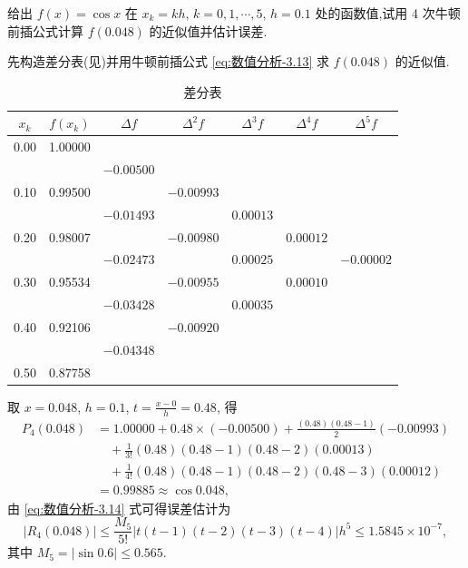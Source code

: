 \documentclass[../../main.tex]{subfiles}%
\begin{document}
\begin{example}
给出 $f(x) = \cos x$ 在 $x_k = kh$, $k = 0, 1, \cdots, 5$, $h = 0.1$ 处的函数值,试用 4 次牛顿前插公式计算 $f(0.048)$ 的近似值并估计误差.
\end{example}
\begin{solution}
先构造差分表(见)并用牛顿前插公式 \eqref{eq:数值分析-3.13} 求 $f(0.048)$ 的近似值.
\begin{table}[H]
\centering
\caption{差分表}
\label{tab:difference-table12312344343452345634456}
\begin{tabular}{c c c c c c c}
\toprule
$x_k$ & $f(x_k)$ & $\Delta f$ & $\Delta^2 f$ & $\Delta^3 f$ & $\Delta^4 f$ & $\Delta^5 f$ \\
\midrule
0.00 & 1.00000 &  &  &  &  &  \\
&  & $-0.00500$ &  &  &  &  \\
0.10 & 0.99500 &  & $-0.00993$ &  &  &  \\
&  & $-0.01493$ &  & $0.00013$ &  &  \\
0.20 & 0.98007 &  & $-0.00980$ &  & $0.00012$ &  \\
&  & $-0.02473$ &  & $0.00025$ &  & $-0.00002$ \\
0.30 & 0.95534 &  & $-0.00955$ &  & $0.00010$ &  \\
&  & $-0.03428$ &  & $0.00035$ &  &  \\
0.40 & 0.92106 &  & $-0.00920$ &  &  &  \\
&  & $-0.04348$ &  &  &  &  \\
0.50 & 0.87758 &  &  &  &  &  \\
\bottomrule
\end{tabular}
\end{table}
取 $x = 0.048$, $h = 0.1$, $t = \frac{x - 0}{h} = 0.48$, 得
\begin{align*}
P_4(0.048) &= 1.00000 + 0.48 \times (-0.00500) + \frac{(0.48)(0.48 - 1)}{2}(-0.00993) \\
&\quad + \frac{1}{3!}(0.48)(0.48 - 1)(0.48 - 2)(0.00013) \\
&\quad + \frac{1}{4!}(0.48)(0.48 - 1)(0.48 - 2)(0.48 - 3)(0.00012) \\
&= 0.99885 \approx \cos 0.048,
\end{align*}
由 \eqref{eq:数值分析-3.14} 式可得误差估计为
\[
|R_4(0.048)| \leqslant \frac{M_5}{5!} | t(t - 1)(t - 2)(t - 3)(t - 4) | h^5 \leqslant 1.5845 \times 10^{-7},
\]
其中 $M_5 = |\sin 0.6| \leqslant 0.565$.

\end{solution}
\end{document}
